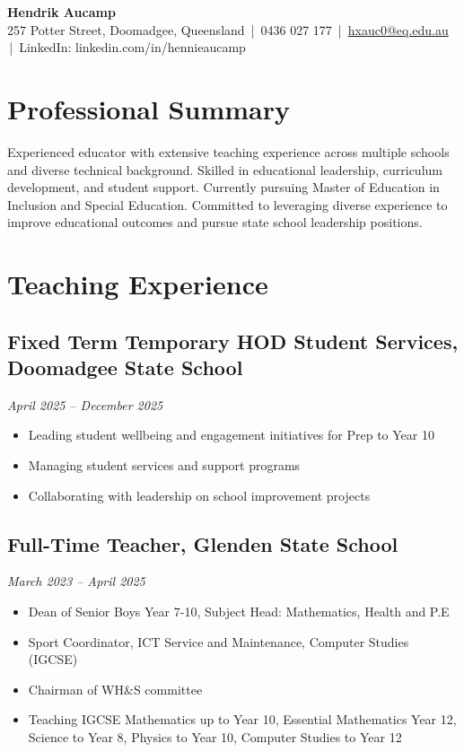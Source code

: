 \documentclass[11pt,a4paper]{article}
\newcommand{\contact}[5]{
    \begin{center}
        {\Huge \textbf{#1}} \\[8pt]
        #2 \,|\, #3 \,|\, \href{mailto:#4}{#4} \,|\, #5
    \end{center}
    \vspace{0.5cm}
}
\begin{document}
\contact{Hendrik Aucamp}
{257 Potter Street, Doomadgee, Queensland}
{0436 027 177}
{hxauc0@eq.edu.au}
{LinkedIn: linkedin.com/in/hennieaucamp}

\section*{Professional Summary}
Experienced educator with extensive teaching experience across multiple schools and diverse technical background. Skilled in educational leadership, curriculum development, and student support. Currently pursuing Master of Education in Inclusion and Special Education. Committed to leveraging diverse experience to improve educational outcomes and pursue state school leadership positions.

\section*{Teaching Experience}

\subsection*{Fixed Term Temporary HOD Student Services, Doomadgee State School}
\textit{April 2025 – December 2025}
\begin{itemize}
    \item Leading student wellbeing and engagement initiatives for Prep to Year 10
    \item Managing student services and support programs
    \item Collaborating with leadership on school improvement projects
\end{itemize}

\subsection*{Full-Time Teacher, Glenden State School}
\textit{March 2023 – April 2025}
\begin{itemize}
    \item Dean of Senior Boys Year 7-10, Subject Head: Mathematics, Health and P.E
    \item Sport Coordinator, ICT Service and Maintenance, Computer Studies (IGCSE)
    \item Chairman of WH\&S committee
    \item Teaching IGCSE Mathematics up to Year 10, Essential Mathematics Year 12, Science to Year 8, Physics to Year 10, Computer Studies to Year 12
\end{itemize}
\end{document}
